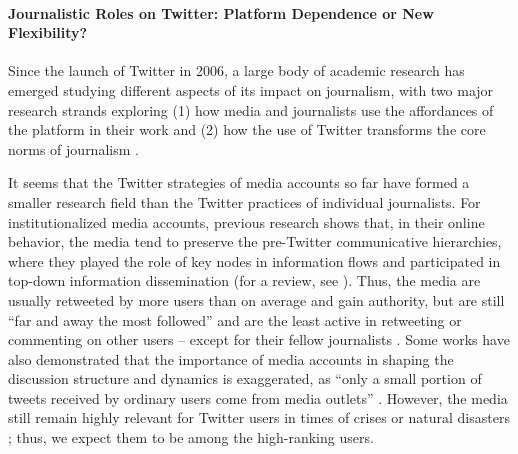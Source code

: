 \paragraph{Journalistic Roles on Twitter: Platform Dependence or New Flexibility?}

Since the launch of Twitter in 2006, a large body of academic research has emerged studying different aspects of its impact on journalism, with two major research strands exploring (1) how media and journalists use the affordances of the platform in their work \cite{BroersmaGraham2013,MelladoVanDalen,PaulussenHarder,Hedman,WeaverWillnat,TandocVos} and (2) how the use of Twitter transforms the core norms of journalism \cite{BrunsHighfield2012,HayesSingerCeppos,Hermida,SkogerboKrumsvik}.

It seems that the Twitter strategies of media accounts so far have formed a smaller research field than the Twitter practices of individual journalists. For institutionalized media accounts, previous research shows that, in their online behavior, the media tend to preserve the pre-Twitter communicative hierarchies, where they played the role of key nodes in information flows and participated in top-down information dissemination (for a review, see \cite{BodrunovaLitvinenkoBlekanov2016}). Thus, the media are usually retweeted by more users than on average and gain authority, but are still “far and away the most followed” and are the least active in retweeting or commenting on other users -- except for their fellow journalists \cite{LotanGraeffAnanny,GroshekTandoc}. Some works have also demonstrated that the importance of media accounts in shaping the discussion structure and dynamics is exaggerated, as “only a small portion of tweets received by ordinary users come from media outlets” \cite[p.~269]{BastosRaimundoTravitzki}. However, the media still remain highly relevant for Twitter users in times of crises or natural disasters \cite{Vis,Bruns2014}; thus, we expect them to be among the high-ranking users.

